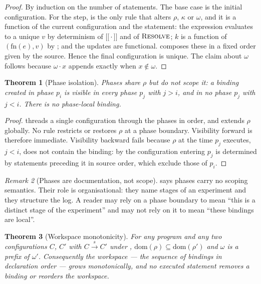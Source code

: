\documentclass[11pt,twocolumn,a4paper]{article}
\theoremstyle{ssthm}
\newtheorem{theorem}{Theorem}[section]
\theoremstyle{definition}
\theoremstyle{remark}
\newtheorem{remark}[theorem]{Remark}
\newcommand{\Env}{\rho}
\newcommand{\Kinds}{\kappa}
\newcommand{\Ord}{\omega}
\providecommand{\llbracket}{\ensuremath{[\![}}
\providecommand{\rrbracket}{\ensuremath{]\!]}}
\begin{document}
\begin{proof}
By induction on the number of statements. The base case is the initial
configuration. For the step,  is the only rule that
alters $\Env$, $\Kinds$ or $\Ord$, and it is a function of the current
configuration and the statement: the expression evaluates to a unique
$v$ by determinism of $\llbracket\cdot\rrbracket$ and of
$\textsc{Resolve}$; $k$ is a function of $(\mathrm{fn}(e),v)$ by
; and the updates are functional. 
composes these in a fixed order given by the source. Hence the final
configuration is unique. The claim about $\Ord$ follows because
$\Ord\cdot x$ appends exactly when $x\notin\Ord$.
\end{proof}

\begin{theorem}[Phase isolation]
\label{thm:isolation}
Phases share $\Env$ but do not scope it: a binding created in phase $p_i$
is visible in every phase $p_j$ with $j>i$, and in no phase $p_j$ with
$j<i$. There is no phase-local binding.
\end{theorem}

\begin{proof}
 threads a single configuration through the phases in
order, and  extends $\Env$ globally. No rule restricts
or restores $\Env$ at a phase boundary. Visibility forward is therefore
immediate. Visibility backward fails because $\Env$ at the time $p_j$
executes, $j<i$, does not contain the binding: by
 the configuration entering $p_j$ is determined by
statements preceding it in source order, which exclude those of $p_i$.
\end{proof}

\begin{remark}[Phases are documentation, not scope]
\label{rem:phase-doc}
 says phases carry no scoping semantics. Their role
is organisational: they name stages of an experiment and they structure
the log. A reader may rely on a phase boundary to mean ``this is a
distinct stage of the experiment'' and may not rely on it to mean
``these bindings are local''.
\end{remark}

\begin{theorem}[Workspace monotonicity]
\label{thm:monotone}
For any program and any two configurations $C$, $C'$ with
$C\xrightarrow{s} C'$ under ,
$\mathrm{dom}(\Env)\subseteq\mathrm{dom}(\Env')$ and $\Ord$ is a prefix
of $\Ord'$. Consequently the workspace --- the sequence of bindings in
declaration order --- grows monotonically, and no executed statement
removes a binding or reorders the workspace.
\end{theorem}
\end{document}
